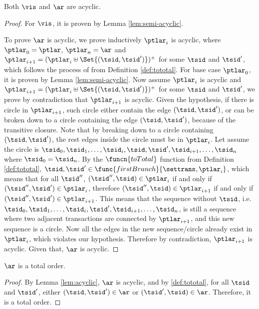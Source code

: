 \begin{lem}[Acyclic]
    \label{lem:acyclic}
    Both \( \vis \) and \( \ar \) are acyclic.
\end{lem}
\begin{proof}
    For \( \vis \), it is proven by Lemma \ref{lem:semi-acyclic}.

    To prove \( \ar \) is acyclic, we prove inductively \( \ptlar_{i} \) is acyclic, where \( \ptlar_{0} = \ptlar \), \( \ptlar_{n} = \ar \) and \( \ptlar_{i+1} = (\ptlar_{i} \uplus \Set{(\tsid, \tsid')})^{+} \) for some \( \tsid \) and \( \tsid' \), which follows the process of  from Definition \ref{def:tototal}.
    For base case \( \ptlar_{0} \), it is proven by Lemma \ref{lem:semi-acyclic}.
    Now assume \( \ptlar_{i} \) is acyclic and \( \ptlar_{i+1} = (\ptlar_{i} \uplus \Set{(\tsid, \tsid')})^{+} \) for some \( \tsid \) and \( \tsid' \), we prove by contradiction that \( \ptlar_{i+1} \) is acyclic.
    Given the hypothesis, if there is circle in \( \ptlar_{i+1} \), such circle either contain the edge \( (\tsid, \tsid') \), or can be broken down to a circle containing the edge \( (\tsid, \tsid') \), because of the transitive closure.
    Note that by breaking down to a circle containing \( ( \tsid, \tsid' ) \), the rest edges inside the circle must be in \( \ptlar_{i} \).
    Let assume the circle is \( \tsid_{0}, \tsid_{1}, \dots, \tsid_{i}, \tsid, \tsid', \tsid_{i+1}, \dots, \tsid_{n} \) where \( \tsid_{0} = \tsid_{n} \).
    By the \( \funcn{toTotal} \) function from Definition \ref{def:tototal}, \( \tsid, \tsid' \in \func{firstBranch}{\settrans, \ptlar_{i}}\), which means that for all \( \tsid'' \), \( (\tsid'', \tsid) \in \ptlar_{i} \) if and only if \( ( \tsid'', \tsid') \in \ptlar_{i} \), therefore \( (\tsid'', \tsid) \in \ptlar_{i+1} \) if and only if \( ( \tsid'', \tsid') \in \ptlar_{i+1} \).
    This means that the sequence without \( \tsid \), i.e.\ \( \tsid_{0}, \tsid_{1}, \dots, \tsid_{i}, \tsid', \tsid_{i+1}, \dots, \tsid_{n} \), is still a sequence where two adjacent transactions are connected by \( \ptlar_{i+1} \), and this new sequence is a circle.
    Now all the edges in the new sequence/circle already exist in \( \ptlar_{i} \), which violates our hypothesis.
    Therefore by contradiction, \( \ptlar_{i+1} \) is acyclic.
    Given that, \( \ar \) is acyclic.
\end{proof}

\begin{lem}
    \label{lem:totalorder}
    \( \ar \) is a total order.
\end{lem}
\begin{proof}
    By Lemma \ref{lem:acyclic}, \( \ar \) is acyclic, and by  \ref{def:tototal}, for all \( \tsid \) and \( \tsid' \), either \( (\tsid, \tsid') \in \ar \) or \( (\tsid', \tsid) \in \ar \).
    Therefore, it is a total order.
\end{proof}

